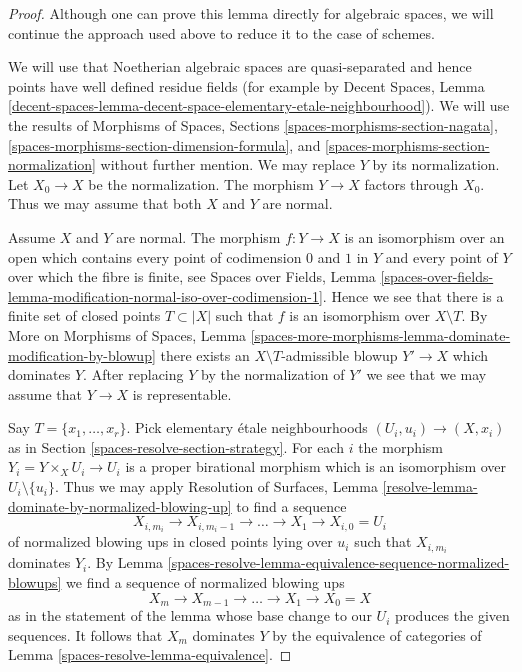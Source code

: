 \begin{proof}
Although one can prove this lemma directly for algebraic spaces,
we will continue the approach used above to reduce it to the case
of schemes.

\medskip\noindent
We will use that Noetherian algebraic spaces are quasi-separated
and hence points have well defined residue fields (for example by
Decent Spaces, Lemma
\ref{decent-spaces-lemma-decent-space-elementary-etale-neighbourhood}).
We will use the results of Morphisms of Spaces, Sections
\ref{spaces-morphisms-section-nagata},
\ref{spaces-morphisms-section-dimension-formula}, and
\ref{spaces-morphisms-section-normalization} without further mention.
We may replace $Y$ by its normalization. Let $X_0 \to X$ be the normalization.
The morphism $Y \to X$ factors through $X_0$.
Thus we may assume that both $X$ and $Y$ are normal.

\medskip\noindent
Assume $X$ and $Y$ are normal. The morphism $f : Y \to X$ is an isomorphism
over an open which contains every point of codimension $0$ and $1$ in $Y$ and
every point of $Y$ over which the fibre is finite, see
Spaces over Fields, Lemma
\ref{spaces-over-fields-lemma-modification-normal-iso-over-codimension-1}.
Hence we see that there is a finite set of closed points $T \subset |X|$
such that $f$ is an isomorphism over $X \setminus T$.
By More on Morphisms of Spaces, Lemma
\ref{spaces-more-morphisms-lemma-dominate-modification-by-blowup}
there exists an $X \setminus T$-admissible blowup $Y' \to X$
which dominates $Y$. After replacing $Y$ by the normalization of
$Y'$ we see that we may assume that $Y \to X$ is representable.

\medskip\noindent
Say $T = \{x_1, \ldots, x_r\}$. Pick elementary \'etale neighbourhoods
$(U_i, u_i) \to (X, x_i)$ as in Section \ref{spaces-resolve-section-strategy}.
For each $i$ the morphism $Y_i = Y \times_X U_i \to U_i$
is a proper birational morphism which is an isomorphism over
$U_i \setminus \{u_i\}$. Thus we may apply
Resolution of Surfaces, Lemma
\ref{resolve-lemma-dominate-by-normalized-blowing-up}
to find a sequence
$$
X_{i, m_i} \to X_{i, m_i - 1} \to \ldots \to X_1 \to X_{i, 0} = U_i
$$
of normalized blowing ups in closed points lying over $u_i$ such that
$X_{i, m_i}$ dominates $Y_i$.
By Lemma \ref{spaces-resolve-lemma-equivalence-sequence-normalized-blowups}
we find a sequence of normalized blowing ups
$$
X_m \to X_{m - 1} \to \ldots \to X_1 \to X_0 = X
$$
as in the statement of the lemma whose base change to our $U_i$
produces the given sequences. It follows that $X_m$ dominates
$Y$ by the equivalence of categories of
Lemma \ref{spaces-resolve-lemma-equivalence}.
\end{proof}

